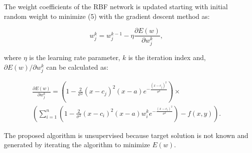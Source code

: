 The weight coefficients of the RBF network is updated starting with initial random weight to minimize (5) with the gradient descent method as:

\begin{equation}
w_j^k=w_j^{k-1}-\eta \frac{\partial E(w)}{\partial w_j^k},
\end{equation}

\noindent
where $\eta$ is the learning rate parameter, $k$ is the iteration index and, \\${\partial E(w)}/{\partial w_j^k}$ can be calculated as:

\begin{equation}
\begin{split}
\frac{\partial E(w)}{\partial w_j^k}=\left ( 1-\frac{2}{\sigma ^{2}}(x-c_j)^{2}(x-a)e^{-\frac{(x-c_{j})^{2}}{\sigma^{2}}} \right)\times \\
\left ( \sum_{i=1}^{n}( 1-\frac{2}{\sigma ^{2}}(x-c_i)^{2}(x-a)w_i^ke^{-\frac{(x-c_{i})^{2}}{\sigma^{2}}})-f(x,y) \right ).
\end{split}
\end{equation}


The proposed algorithm is unsupervised because target solution is not known and generated by iterating the algorithm to minimize $E(w)$.


